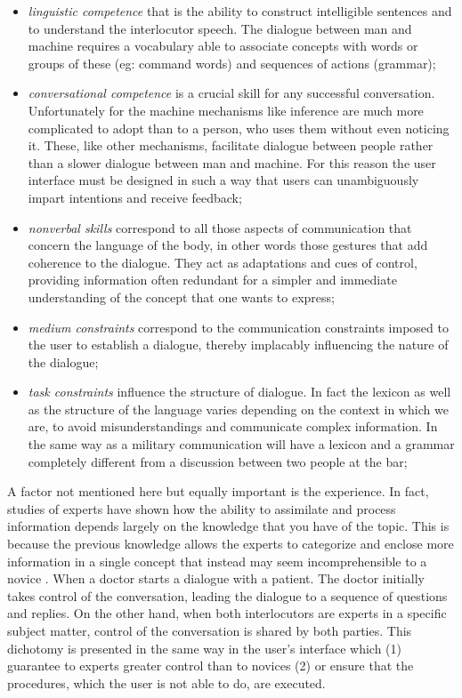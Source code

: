 \documentclass{thesisreport}
\begin{document}
 \begin{itemize}
     \item \textit{linguistic competence} that is the ability to construct intelligible sentences and to understand the interlocutor speech. The dialogue between man and machine requires a vocabulary able to associate concepts with words or groups of these (eg: command words) and sequences of actions (grammar);
     \item \textit{conversational competence} is a crucial skill for any successful conversation. Unfortunately for the machine mechanisms like inference are much more complicated to adopt than to a person, who uses them without even noticing it. These, like other mechanisms, facilitate dialogue between people rather than a slower dialogue between man and machine. For this reason the user interface must be designed in such a way that users can unambiguously impart intentions and receive feedback;
     \item \textit{nonverbal skills} correspond to all those aspects of communication that concern the language of the body, in other words those gestures that add coherence to the dialogue. They act as adaptations and cues of control, providing information often redundant for a simpler and immediate understanding of the concept that one wants to express;
     \item \textit{medium constraints} correspond to the communication constraints imposed to the user to establish a dialogue, thereby implacably influencing the nature of the dialogue;
     \item \textit{task constraints} influence the structure of dialogue. In fact the lexicon as well as the structure of the language  varies depending on the context in which we are, to avoid misunderstandings and communicate complex information. In the same way as a military communication  will have a lexicon and a grammar completely different from a discussion between two people at the bar;
     
 \end{itemize}
 A factor not mentioned here but equally important is the experience. In fact, studies of experts have shown how the ability to assimilate and process information depends largely on the knowledge that you have of the topic. This is because the previous knowledge allows the experts to categorize and enclose more information in a single concept that instead may seem incomprehensible to a novice \cite{fong2001collaboration}.
 When a doctor starts a dialogue with a patient. The doctor initially takes control of the conversation, leading the dialogue to a sequence of questions and replies. On the other hand, when both interlocutors are experts in a specific subject matter, control of the conversation is shared by both parties.
 This dichotomy is presented in the same way in the user's interface which (1) guarantee to experts greater control than to novices (2) or ensure that the procedures, which the user is not able to do, are executed.
\end{document}
